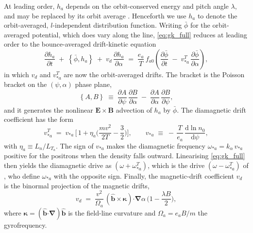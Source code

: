 \documentclass{jpp}
\newcommand{\rmd}{\text{d}}
\renewcommand{\vec}[1]{\boldsymbol{#1}}
\newcommand{\vec}[1]{\boldsymbol{#1}}
\newcommand{\uvec}[1]{\hat{\boldsymbol{#1}}}
\providecommand{\bcdot}{\vec{\cdot}}
\newcommand{\grad}{{\vec{\nabla}}}
\newcommand{\pbra}[2]{\left\lbrace #1, #2 \right\rbrace}
\newcommand{\vE}{\vec{E}}
\newcommand{\vB}{\vec{B}}
\begin{document}
At leading order, $h_a$ depends on the orbit-conserved energy and pitch angle $\lambda$, and may be replaced by its orbit average \citep{Helander2014, MPH2018}. Henceforth we use $h_a$ to denote the orbit-averaged, $l$-independent distribution function. Writing $\bar\phi$ for the orbit-averaged potential, which does vary along the line, \cref{eq:gk_full} reduces at leading order to the bounce-averaged drift-kinetic equation
\begin{equation}\label{eq:dke}
\frac{\partial h_a}{\partial t} \;+\; \pbra{\bar{\phi}}{h_a} \;+\; v_d\, \frac{\partial h_a}{\partial \alpha} \;=\; \frac{e_a}{T}\,f_{a0}\left(\frac{\partial \bar{\phi}}{\partial t} \;-\; v_{*a}^T\,\frac{\partial \bar{\phi}}{\partial \alpha}\right),
\end{equation}
in which $v_d$ and $v_{*a}^T$ are now the orbit-averaged drifts. The bracket is the Poisson bracket on the $(\psi,\alpha)$ phase plane,
\begin{equation}\label{eq:bracket}
\pbra{A}{B} \;\equiv\; \frac{\partial A}{\partial \psi}\, \frac{\partial B}{\partial \alpha} \;-\; \frac{\partial A}{\partial \alpha}\, \frac{\partial B}{\partial \psi},
\end{equation}
and it generates the nonlinear $\vE \times \vB$ advection of $h_a$ by $\bar\phi$. The diamagnetic drift coefficient has the form
\begin{equation}\label{eq:vstar}
v_{*a}^T \;=\; v_{*a}\,\biggl[\, 1 + \eta_a\biggl(\frac{m v^2}{2T} - \frac{3}{2}\biggr)\biggr],\qquad
v_{*a} \;\equiv\; -\,\frac{T}{e_a}\, \frac{\rmd \ln n_0}{\rmd\psi},
\end{equation}
with $\eta_a \equiv L_n/L_{T_a}$. The sign of $v_{*a}$ makes the diamagnetic frequency $\omega_{*a} = k_\alpha\, v_{*a}$ positive for the positrons when the density falls outward. Linearising \cref{eq:gk_full} then yields the diamagnetic drive as $(\omega + \omega_{*a}^T)$, which is the drive $(\omega - \omega_{*a}^T)$ of \citet{MPH2018}, who define $\omega_{*a}$ with the opposite sign. Finally, the magnetic-drift coefficient $v_d$ is the binormal projection of the magnetic drifts,
\begin{equation}\label{eq:vd}
v_d \;=\; \frac{v^2}{\Omega_a}\, (\uvec{b}\times\vec{\kappa})\bcdot\grad\alpha\, \biggl(1 - \frac{\lambda B}{2}\biggr),
\end{equation}
where $\vec{\kappa} = (\uvec{b}\bcdot\grad)\uvec{b}$ is the field-line curvature and $\Omega_a = e_a B/m$ the gyrofrequency.
\end{document}
